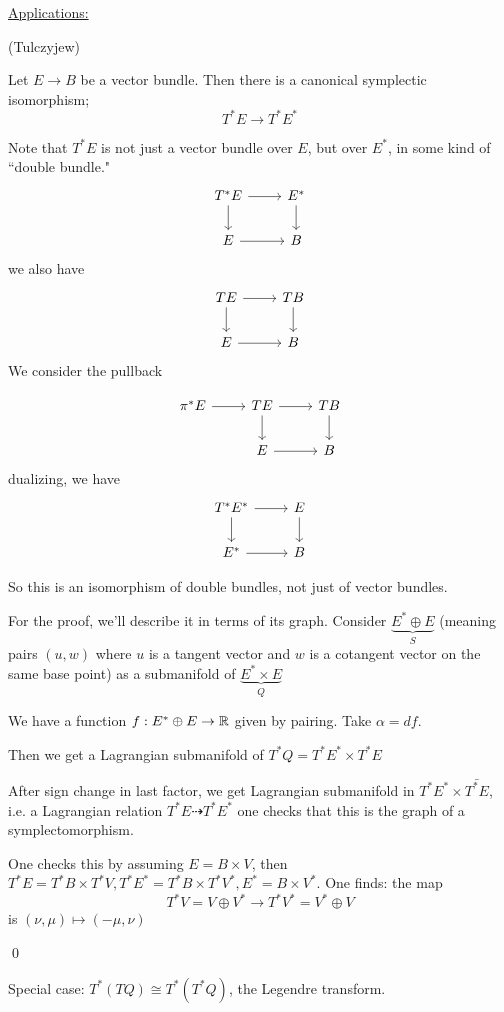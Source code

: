 \documentclass[x11names,reqno,14pt]{extarticle}
\begin{document}
\underline{Applications:}

\thm(Tulczyjew)

Let $E\to B$ be a vector bundle. Then there is a canonical symplectic isomorphism; 
\[
T^*E\to T^*E^*
\]

\proof

Note that $T^*E$ is not just a vector bundle over $E$, but over $E^*$, in some kind of ``double bundle."
\[
\begin{tikzcd}
T^*E \ar[r] \ar[d] & E^* \ar[d] \\
E \ar[r] & B
\end{tikzcd}
\]
we also have
\[
\begin{tikzcd}
TE \ar[r] \ar[d] & TB \ar[d] \\
E \ar[r] & B
\end{tikzcd}
\]
We consider the pullback

\[
\begin{tikzcd}
\pi^*E \ar[r] & TE \ar[r] \ar[d] & TB \ar[d] \\
& E \ar[r] & B
\end{tikzcd}
\]
dualizing, we have
\[
\begin{tikzcd}
T^*E^* \ar[r] \ar[d] & E \ar[d] \\
E^* \ar[r] & B
\end{tikzcd}
\]

So this is an isomorphism of double bundles, not just of vector bundles. 

For the proof, we'll describe it in terms of its graph. Consider $\underbrace{E^*\oplus E}_{S}$ (meaning pairs $(u,w)$ where $u$ is a tangent vector and $w$ is a cotangent vector on the same base point) as a submanifold of $\underbrace{E^*\times E}_{Q}$

We have a function $f:E^*\oplus E\to \mathbb{R}$ given by pairing. Take $\alpha = df$. 

Then we get a Lagrangian submanifold of $T^*Q = T^*E^*\times T^*E$

After sign change in last factor, we get Lagrangian submanifold in $T^*E^*\times\bar{T^*E}$, i.e. a Lagrangian relation $T^*E\dashrightarrow T^*E^*$ one checks that this is the graph of a symplectomorphism. 

One checks this by assuming $E = B\times V$, then $T^*E = T^*B\times T^*V, T^*E^* = T^*B\times T^*V^*, E^* = B\times V^*$. One finds: the map 
\[
T^*V=V\oplus V^* \to T^*V^* = V^*\oplus V
\]
is $(\nu,\mu)\mapsto(-\mu,\nu)$

\qed

Special case: $T^*(TQ) \cong T^*(T^*Q)$, the Legendre transform. 
\end{document}
